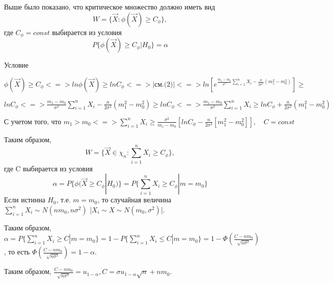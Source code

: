 \documentclass[a4paper, 12pt]{article}
\theoremstyle{definition}
\theoremstyle{leads}
\theoremstyle{example}
\theoremstyle{remark}
\begin{document}
Выше было показано, что критическое множество должно иметь вид
\begin{equation*}
	W = \{\vec{X}: \phi(\vec{X}) \geq C_\phi\},
\end{equation*}
где $C_\phi = const$ выбирается из условия 
\begin{equation*}
	P\{\phi(\vec{X}) \geq C_\phi | H_0\} = \alpha
\end{equation*}

Условие 
\begin{center}
	\centering
	$\phi(\vec{X}) \geq C_\phi <=> ln \phi(\vec{X}) \geq ln C_\phi <=> |\text{см.(2)}| <=> ln[e^{\frac{m_1 - m_0}{\sigma^2} \sum_{i=1}^{n}X_i - \frac{n}{2\sigma^2}(m_1^2 - m_0^2)}] \geq$  
\end{center}
\begin{center}
	\centering
	$lnC_\phi <=> \frac{m_1 - m_0}{\sigma^2} \sum_{i=1}^{n} X_i - \frac{n}{2\sigma^2}(m_1^2 - m_0^2) \geq ln C_\phi <=> \frac{m_1 - m_0}{\sigma^2} \sum_{i=1}^{n}X_i \geq ln C_\phi  + \frac{n}{2 \sigma^2}(m_1^2 - m_0^2)$
\end{center}
\begin{center}
	\centering
	$\text{С учетом того, что  }  m_1 > m_0 <=> \sum_{i=1}^{n} X_i \geq \frac{\sigma^2}{m_1 - m_0}[ln C_\phi - \frac{n}{2 \sigma^2}[m_1^2 - m_0^2]], \quad C = const$  
\end{center}
Таким образом, 
\begin{equation*}
W = \{\vec{X} \in \chi_n : \sum_{i=1}^{n} X_i \geq C_\phi\},
\end{equation*}
где C выбирается из условия
\begin{equation*}
	\alpha = P\{\phi(\vec{X} \geq C_\phi | H_0)\} = P\{\sum_{i=1}^{n} X_i \geq C_\phi | m = m_0\}
\end{equation*}
Если истинна $H_0$, т.е. $m = m_0$, то случайная величина $\sum_{i=1}^{n} X_i \sim N(nm_0, n\sigma^2)$ |$X_i \sim X \sim N(m_0, \sigma^2)$|.

Таким образом, $\alpha = P\{\sum_{i=1}^{n}X_i \geq C | m = m_0 \} = 1 - P\{\sum_{i=1}^{n}X_i \leq C | m = m_0\} = 1 - \Phi(\frac{C - nm_0}{\sqrt{n \sigma^2}})$, то есть $\Phi(\frac{C - nm_0}{\sqrt{n \sigma^2}}) = 1 - \alpha$.

Таким образом, $\frac{C - nm_0}{\sqrt{n\sigma^2}} = u_{1 - \alpha}, C = \sigma u_{1 - \alpha} \sqrt{n} + nm_0$.
\end{document}

